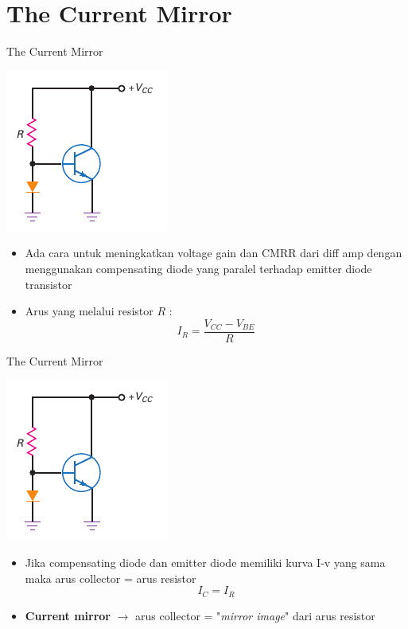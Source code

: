 \documentclass[aspectratio=169]{beamer}
\begin{document}
\section{The Current Mirror}
\begin{frame}{The Current Mirror}
	\begin{multicols}{2}
		\begin{center}
			\includegraphics[height=0.5\textheight]{gambar/01.fig28}
		\end{center}
		\columnbreak
		\begin{itemize}
			\item Ada cara untuk meningkatkan voltage gain dan CMRR dari diff amp dengan menggunakan compensating diode yang paralel terhadap emitter diode transistor
			\item Arus yang melalui resistor $ R $ :
			\begin{equation}\label{pers.23}
				I_R = \frac{V_{CC} - V_{BE}}{R}
			\end{equation}
		\end{itemize}
	\end{multicols}
\end{frame}

\begin{frame}{The Current Mirror}
	\begin{multicols}{2}
		\begin{center}
			\includegraphics[height=0.5\textheight]{gambar/01.fig28}
		\end{center}
		\columnbreak
		\begin{itemize}
			\item Jika compensating diode dan emitter diode memiliki kurva I-v yang sama maka arus collector = arus resistor
			\begin{equation}\label{pers.24}
				I_C = I_R
			\end{equation}
			\item \textbf{Current mirror} $ \rightarrow $ arus collector = "\textit{mirror image}" dari arus resistor
		\end{itemize}
	\end{multicols}
\end{frame}
\end{document}
